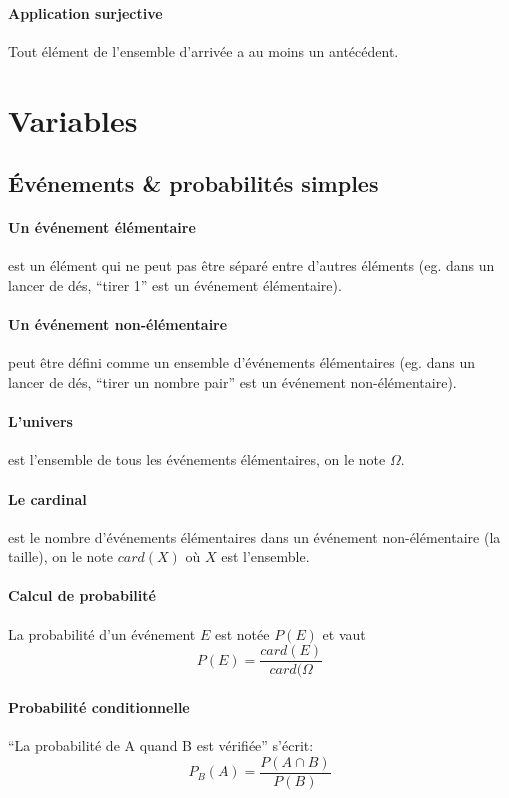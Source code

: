 \documentclass[10pt,a4paper,french]{article}
\begin{document}
\paragraph{Application surjective}
Tout élément de l'ensemble d'arrivée a au moins un antécédent.

\section{Variables}

\subsection{Événements \& probabilités simples}

\paragraph{Un événement élémentaire} est un élément qui ne peut pas être séparé entre d'autres éléments (eg. dans un lancer de dés, ``tirer 1'' est un événement élémentaire).

\paragraph{Un événement non-élémentaire} peut être défini comme un ensemble d'événements élémentaires (eg. dans un lancer de dés, ``tirer un nombre pair'' est un événement non-élémentaire).

\paragraph{L'univers} est l'ensemble de tous les événements élémentaires, on le note $\Omega$.

\paragraph{Le cardinal} est le nombre d'événements élémentaires dans un événement non-élémentaire (la taille), on le note $card(X)$ où $X$ est l'ensemble.

\paragraph{Calcul de probabilité} La probabilité d'un événement $E$ est notée $P(E)$ et vaut \[ P(E) = \frac{card(E)}{card(\Omega} \]

\paragraph{Probabilité conditionnelle}
``La probabilité de A quand B est vérifiée'' s'écrit: \[ P_B(A)=\frac{P(A \cap B)}{P(B)} \]
\end{document}
